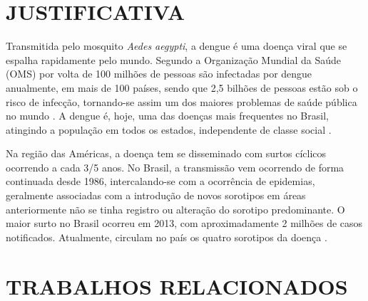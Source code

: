 \documentclass[
	12pt,				%
	openright,			%
	oneside,	
	a4paper,				%
	english,				%
	brazil				%
]{abntex2/abntex2} %
\begin{document}
	\section{JUSTIFICATIVA}
	

	Transmitida pelo mosquito \textit{Aedes aegypti}, a dengue é uma doença viral que se espalha rapidamente pelo mundo. Segundo a Organização Mundial da Saúde (OMS) por volta de 100 milhões de pessoas são infectadas por dengue anualmente, em mais de 100 países, sendo que 2,5 bilhões de pessoas estão sob o risco de infecção, tornando-se assim um dos maiores problemas de saúde pública no mundo \cite{bhatt:2013}. A dengue é, hoje, uma das doenças mais frequentes no Brasil, atingindo a população em todos os estados, independente de classe social \cite{saude:2008}.
	
	Na região das Américas, a doença tem se disseminado com surtos cíclicos ocorrendo a cada 3/5 anos. No Brasil, a transmissão vem ocorrendo de forma continuada desde 1986, intercalando-se com a ocorrência de epidemias, geralmente associadas com a introdução de novos sorotipos em áreas anteriormente não se tinha registro ou alteração do sorotipo predominante. O maior surto no Brasil ocorreu em 2013, com aproximadamente 2 milhões de casos notificados. Atualmente, circulam no país os quatro sorotipos da doença \cite{MS:2015}.
	

	
	\section{TRABALHOS RELACIONADOS}	
	
\end{document}
